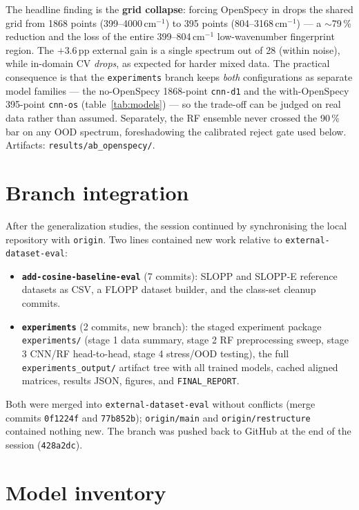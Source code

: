 \documentclass[11pt,a4paper]{article}
\begin{document}
The headline finding is the \textbf{grid collapse}: forcing OpenSpecy in drops
the shared grid from 1868 points (399--4000\,cm$^{-1}$) to 395 points
(804--3168\,cm$^{-1}$) --- a $\sim$79\,\% reduction and the loss of the entire
399--804\,cm$^{-1}$ low-wavenumber fingerprint region. The $+3.6$\,pp external
gain is a single spectrum out of 28 (within noise), while in-domain CV
\emph{drops}, as expected for harder mixed data. The practical consequence is
that the \texttt{experiments} branch keeps \emph{both} configurations as
separate model families --- the no-OpenSpecy 1868-point \texttt{cnn-d1} and the
with-OpenSpecy 395-point \texttt{cnn-os} (table~\ref{tab:models}) --- so the
trade-off can be judged on real data rather than assumed. Separately, the RF
ensemble never crossed the 90\,\% bar on any OOD spectrum, foreshadowing the
calibrated reject gate used below. Artifacts: \texttt{results/ab\_openspecy/}.

\section{Branch integration}

After the generalization studies, the session continued by synchronising the
local repository with
\texttt{origin}. Two lines contained new work relative to
\texttt{external-dataset-eval}:

\begin{itemize}
  \item \textbf{\texttt{add-cosine-baseline-eval}} (7 commits): SLOPP and
        SLOPP-E reference datasets as CSV, a FLOPP dataset builder, and the
        class-set cleanup commits.
  \item \textbf{\texttt{experiments}} (2 commits, new branch): the staged
        experiment package \texttt{experiments/} (stage 1 data summary, stage 2
        RF preprocessing sweep, stage 3 CNN/RF head-to-head, stage 4
        stress/OOD testing), the full \texttt{experiments\_output/} artifact
        tree with all trained models, cached aligned matrices, results JSON,
        figures, and \texttt{FINAL\_REPORT}.
\end{itemize}

Both were merged into \texttt{external-dataset-eval} without conflicts
(merge commits \texttt{0f1224f} and \texttt{77b852b}); \texttt{origin/main} and
\texttt{origin/restructure} contained nothing new. The branch was pushed back
to GitHub at the end of the session (\texttt{428a2dc}).

\section{Model inventory}
\end{document}
